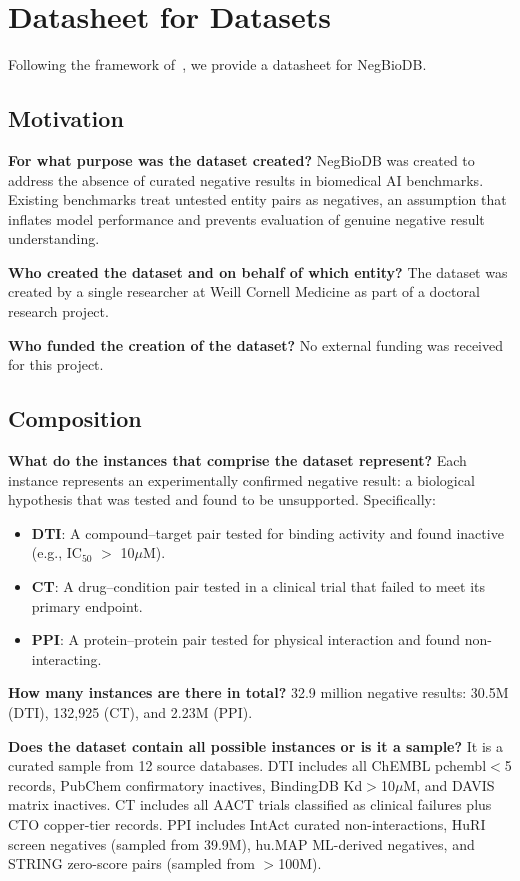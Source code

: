 \section{Datasheet for Datasets}
\label{app:datasheet}

Following the framework of~\citet{gebru2021datasheets}, we provide a datasheet for NegBioDB.

\subsection{Motivation}

\textbf{For what purpose was the dataset created?}
NegBioDB was created to address the absence of curated negative results in biomedical AI benchmarks. Existing benchmarks treat untested entity pairs as negatives, an assumption that inflates model performance and prevents evaluation of genuine negative result understanding.

\textbf{Who created the dataset and on behalf of which entity?}
The dataset was created by a single researcher at Weill Cornell Medicine as part of a doctoral research project.

\textbf{Who funded the creation of the dataset?}
No external funding was received for this project.

\subsection{Composition}

\textbf{What do the instances that comprise the dataset represent?}
Each instance represents an experimentally confirmed negative result: a biological hypothesis that was tested and found to be unsupported. Specifically:
\begin{itemize}[nosep,leftmargin=*]
    \item \textbf{DTI}: A compound--target pair tested for binding activity and found inactive (e.g., IC$_{50}$ $>$ 10$\mu$M).
    \item \textbf{CT}: A drug--condition pair tested in a clinical trial that failed to meet its primary endpoint.
    \item \textbf{PPI}: A protein--protein pair tested for physical interaction and found non-interacting.
\end{itemize}

\textbf{How many instances are there in total?}
32.9 million negative results: 30.5M (DTI), 132,925 (CT), and 2.23M (PPI).

\textbf{Does the dataset contain all possible instances or is it a sample?}
It is a curated sample from 12 source databases. DTI includes all ChEMBL pchembl$<$5 records, PubChem confirmatory inactives, BindingDB Kd$>$10$\mu$M, and DAVIS matrix inactives. CT includes all AACT trials classified as clinical failures plus CTO copper-tier records. PPI includes IntAct curated non-interactions, HuRI screen negatives (sampled from 39.9M), hu.MAP ML-derived negatives, and STRING zero-score pairs (sampled from $>$100M).

